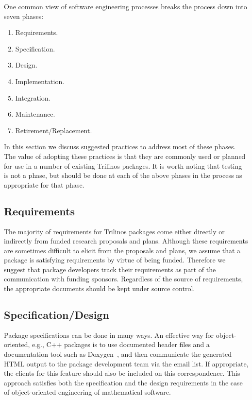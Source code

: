 \documentclass[12pt,strict]{TrilinosDevGuide}
\begin{document}
One common view of software engineering processes breaks the process down into 
seven phases:
\begin{enumerate}
\item Requirements.
\item Specification.
\item Design.
\item Implementation.
\item Integration.
\item Maintenance.
\item Retirement/Replacement.
\end{enumerate}
In this section we discuss suggested practices to address most of these 
phases.  The value of adopting these practices is that they are commonly used 
or planned for use in a number of existing Trilinos packages.  It is worth 
noting that testing is not a phase, but should be done at each of the above 
phases in the process as appropriate for that phase.

\subsection{Requirements}
The majority of requirements for Trilinos packages come either directly or 
indirectly from funded research proposals and plans.  Although these 
requirements are sometimes difficult to elicit from the proposals and plans, 
we assume that a package is satisfying requirements by virtue of being 
funded.  Therefore we suggest that package developers track their 
requirements as part of the communication with funding sponsors.
Regardless of the source of requirements, the appropriate documents
should be kept under source control.

\subsection{Specification/Design}
Package specifications can be done in many ways.  An effective way for 
object-oriented, e.g., C++ packages is to use documented header files and a 
documentation tool such as Doxygen~\cite{Doxygen}, and then communicate the 
generated HTML output to the package development team via the \newline
{} email list.  If
appropriate, the clients for this feature should also be included on
this correspondence.  This
approach satisfies both the specification and the design requirements
in the case of object-oriented engineering of mathematical software.
\end{document}
